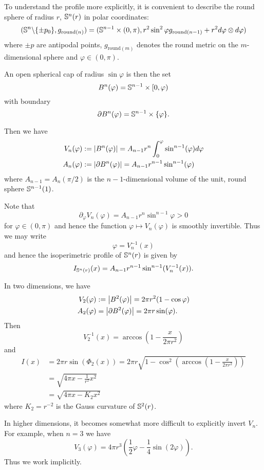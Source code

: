 \documentclass{amsart}
\begin{document}
To understand the profile more explicitly, it is convenient to describe the round sphere of radius \(r\), \(\S^n(r)\) in polar coordinates:
\[
(\S^n\backslash \{\pm p_0\}, g_{\text{round}(n)}) = (\S^{n-1} \times (0, \pi), r^2 \sin^2 \varphi g_{\text{round}(n-1)} + r^2 d\varphi \otimes d\varphi)
\]
where \(\pm p\) are antipodal points, \(g_{\text{round}(m)}\) denotes the round metric on the \(m\)-dimensional sphere and \(\varphi \in (0, \pi)\).

An open spherical cap of radius \(\sin \varphi\) is then the set
\[
B^n(\varphi) = \S^{n-1} \times [0, \varphi)
\]
with boundary
\[
\bdry{B^n(\varphi)} = \S^{n-1} \times \{\varphi\}.
\]

Then we have
\begin{align*}
V_n(\varphi) &:= \abs{B^n(\varphi)} = A_{n-1} r^n \int_0^{\varphi} \sin^{n-1} (\varphi) d\varphi \\
A_n(\varphi) &:= \abs{\bdry{B^n(\varphi)}} = A_{n-1} r^{n-1} \sin^{n-1} (\varphi)
\end{align*}
where \(A_{n-1} = A_{n}(\pi/2)\) is the \(n-1\)-dimensional volume of the unit, round sphere \(\S^{n-1}(1)\).

Note that
\[
\partial_{\varphi} V_n(\varphi) = A_{n-1} r^n \sin^{n-1} \varphi > 0
\]
for \(\varphi \in (0, \pi)\) and hence the function \(\varphi \mapsto V_n(\varphi)\) is smoothly invertible. Thus we may write
\[
\varphi = V_n^{-1}(x)
\]
and hence the isoperimetric profile of \(\S^n(r)\) is given by
\[
I_{\S^n(r)} (x) = A_{n-1} r^{n-1} \sin^{n-1} (V_n^{-1}(x)).
\]

In two dimensions, we have
\begin{align*}
V_2(\varphi) &:= \abs{B^2(\varphi)} = 2\pi r^2(1-\cos\varphi) \\
A_2(\varphi) &= \abs{\bdry{B^2(\varphi)}} = 2\pi r \sin (\varphi).
\end{align*}
Then
\[
V_2^{-1}(x) = \arccos\left(1 - \frac{x}{2\pi r^2} \right)
\]
and
\[
\begin{split}
I(x) &= 2\pi r \sin(\Phi_2(x)) = 2\pi r \sqrt{1 - \cos^2\left(\arccos\left(1 - \frac{x}{2\pi r^2} \right)\right)} \\
&= \sqrt{4\pi x - \frac{1}{r^2} x^2} \\
&= \sqrt{4\pi x - K_2 x^2}
\end{split}
\]
where \(K_2 = r^{-2}\) is the Gauss curvature of \(\S^2(r)\).

In higher dimensions, it becomes somewhat more difficult to explicitly invert \(V_n\). For example, when \(n = 3\) we have
\[
V_3(\varphi) = 4\pi r^3\left(\frac{1}{2} \varphi - \frac{1}{4}\sin(2 \varphi)\right).
\]
Thus we work implicitly.
\end{document}

